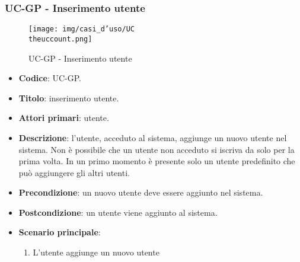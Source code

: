 \subsubsection{UC\theuccount-GP - Inserimento utente}
		\begin{figure}[H]
			\centering
				\texttt{[image: img/casi\_d'uso/UC\\theuccount.png]}\\
			\caption{UC\theuccount-GP - Inserimento utente}
		\end{figure}
	\begin{itemize}
		\item \textbf{Codice}: UC\theuccount-GP.
		\item \textbf{Titolo}: inserimento utente.
		\item \textbf{Attori primari}: utente.
		\item \textbf{Descrizione}: l'utente, acceduto al sistema, aggiunge un nuovo utente nel sistema.
		Non è possibile che un utente non acceduto si iscriva da solo per la prima volta.
		In un primo momento è presente solo un utente predefinito che può aggiungere gli altri utenti.
		\item \textbf{Precondizione}: un nuovo utente deve essere aggiunto nel sistema.
		\item \textbf{Postcondizione}: un utente viene aggiunto al sistema.
		\item \textbf{Scenario principale}:
		\begin{enumerate}
			\item L'utente aggiunge un nuovo utente
		\end{enumerate}
	\end{itemize}



